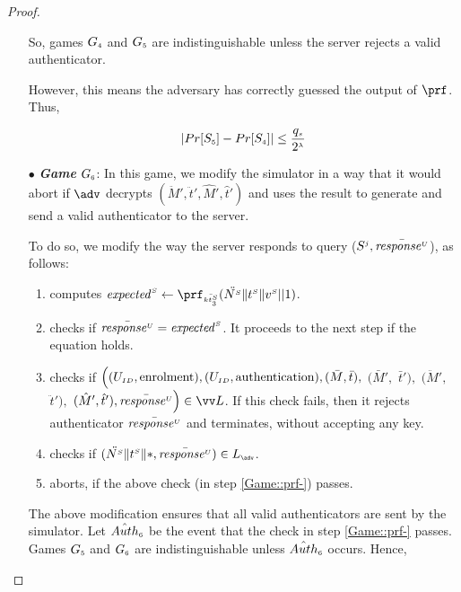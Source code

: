 \begin{proof}
\begin{itemize}
So, games $G_{\scriptscriptstyle  4}$ and $G_{\scriptscriptstyle  5}$ are indistinguishable unless the server rejects a valid authenticator. 

However, this means the adversary has correctly guessed the output of $\prf$. Thus, 

\begin{equation}\label{eq::game_5}
|Pr[S_{\scriptscriptstyle  5}]-Pr[S_{\scriptscriptstyle  4}]|\leq \frac{q_{\scriptscriptstyle  s}}{2^{\scriptscriptstyle \lambda}}
\end{equation}



\item[$\bullet$] \textit{\textbf{Game}}  $G_{\scriptscriptstyle  6}$: 
 In this game, we modify the simulator in a way that it would abort if $\adv$ decrypts $ (\ddot M', \ddot t', \hat M', \hat t')$ and uses the result to generate and send a valid authenticator to the server. 
 
 To do so, we modify the way the server responds to  query {\send($S^{\scriptscriptstyle  j},   \bar{\mathit{response}^{\scriptscriptstyle U}}$)}, as follows: 

\begin{enumerate}
%
\item computes $\VS{\mathit{expected}} \gets \prf_{\sss\bar{\VS{\keyt_{\sss3}}}}(\ddot{\VS{\nonce}}  \| \VS{\trans} \| \VS{\verifier}||1)$.
%
\item checks if $\bar{\mathit{response}^{\scriptscriptstyle U}}=\mathit{expected}^{\scriptscriptstyle S}$. It proceeds to the next step if the equation holds. 
%
\item\label{Game::check-sim-} checks if $\Big((U_{\scriptscriptstyle  ID},  \text{enrolment}), (U_{\scriptscriptstyle  ID},  \text{authentication}), (\bar M, \bar t),$ $ (\bar M',$ $ \bar t'),$ $ (\ddot M', $ $\ddot t'), $ $(\hat M', \hat t'), \bar{\VC{\mathit{response}}}\Big)\in \vv L$. If this check fails, then it rejects authenticator  $\bar{\mathit{response}^{\scriptscriptstyle U}}$ and terminates, without accepting any key.

\item\label{Game::prf-} checks if $(\ddot{\VS{\nonce}}  \| \VS{\trans} \| *,\bar{\VC{\mathit{response}}})\in L_{\sss \adv}$.  
%
\item aborts, if the above check (in step \ref{Game::prf-}) passes.
%
\end{enumerate}

The above modification ensures that all valid authenticators are sent by the simulator. Let $\hat {Auth}_{\scriptscriptstyle  6}$ be the event that the check in step \ref{Game::prf-} passes. Games $G_{\scriptscriptstyle  5}$ and $G_{\scriptscriptstyle  6}$ are indistinguishable unless $\hat {Auth}_{\scriptscriptstyle  6}$ occurs. Hence,


\end{itemize}
\end{proof}
